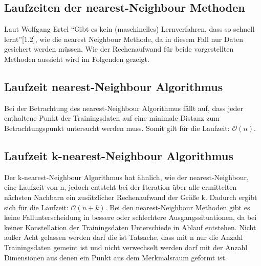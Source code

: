 \documentclass[a4paper]{scrartcl}
\begin{document}
\begin{multicols}{2}
        \section{Laufzeiten der nearest-Neighbour Methoden}
            Laut Wolfgang Ertel “Gibt es kein (maschinelles) Lernverfahren, dass so schnell lernt”[1.2], wie die nearest Neighbour Methode, da in diesem Fall nur Daten gesichert werden müssen. Wie der Rechenaufwand für beide vorgestellten Methoden aussieht wird im Folgenden gezeigt.
                        
            \subsection{Laufzeit nearest-Neighbour Algorithmus}
                Bei der Betrachtung des nearest-Neighbour Algorithmus fällt auf, dass jeder enthaltene Punkt der Trainingsdaten auf eine minimale Distanz zum Betrachtungspunkt untersucht werden muss. Somit gilt für die Laufzeit:
                $\mathcal{O}(n)$.   
            
            \subsection{Laufzeit k-nearest-Neighbour Algorithmus}
                Der k-nearest-Neighbour Algorithmus hat ähnlich, wie der nearest-Neighbour, eine Laufzeit von n, jedoch entsteht bei der Iteration über alle ermittelten nächsten Nachbarn ein zusätzlicher Rechenaufwand der Größe k. Dadurch ergibt sich für die Laufzeit:
                $\mathcal{O}(n+k)$.
                Bei den nearest-Neighbour Methoden gibt es keine Fallunterscheidung in bessere oder schlechtere Ausgangssituationen, da bei keiner Konstellation der Trainingsdaten Unterschiede in Ablauf entstehen.
                Nicht außer Acht gelassen werden darf die ist Tatsache, dass mit n nur die Anzahl Trainingsdaten gemeint ist und nicht verwechselt werden darf mit der Anzahl Dimensionen aus denen ein Punkt aus dem Merkmalsraum geformt ist.

    \end{multicols}

    
    
\end{document}
